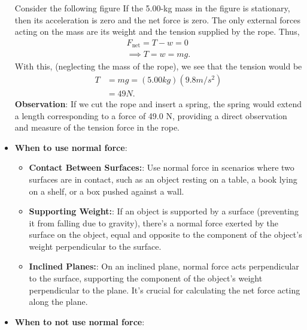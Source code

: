 \documentclass{report}
\begin{document}
\begin{itemize}
                \smallbreak \noindent
                Consider the following figure
                \bigbreak \noindent 
                \bigbreak \noindent 
                If the 5.00-kg mass in the figure is stationary, then its acceleration is zero and the net force is zero. The only external forces acting on the mass are its weight and the tension supplied by the rope. Thus,
                \begin{align*}
                    F_{\text{net}} = T - w = 0 \\
                    \implies  T = w = mg
                .\end{align*}
                With this, (neglecting the mass of the rope), we see that the tension would be
                \begin{align*}
                    T &= mg = (5.00kg)(9.8 m/s^{2}) \\
                    &=49N
                .\end{align*}
                \bigbreak \noindent 
                \textbf{Observation}: If we cut the rope and insert a spring, the spring would extend a length corresponding to a force of 49.0 N, providing a direct observation and measure of the tension force in the rope.
            \item \textbf{When to use normal force}:
                \begin{itemize}
                    \item \textbf{Contact Between Surfaces:}: Use normal force in scenarios where two surfaces are in contact, such as an object resting on a table, a book lying on a shelf, or a box pushed against a wall.
                    \item \textbf{Supporting Weight:}: If an object is supported by a surface (preventing it from falling due to gravity), there's a normal force exerted by the surface on the object, equal and opposite to the component of the object's weight perpendicular to the surface.
                    \item \textbf{Inclined Planes:}: On an inclined plane, normal force acts perpendicular to the surface, supporting the component of the object's weight perpendicular to the plane. It's crucial for calculating the net force acting along the plane.
                \end{itemize}
            \item \textbf{When to not use normal force}:
                \begin{itemize}

\end{itemize}
\end{itemize}
\end{document}
